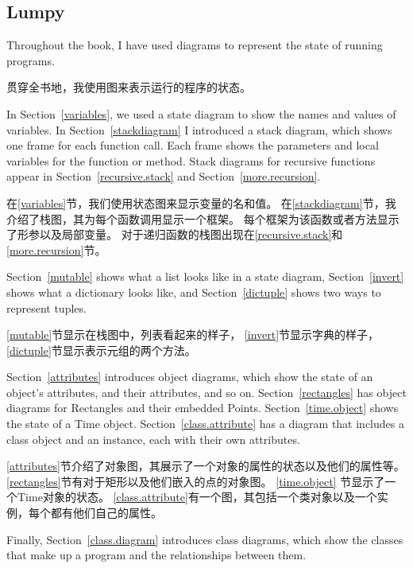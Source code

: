 \documentclass[10pt]{book}
\begin{document}
\begin{CJK}{UTF8}{gbsn}
\chapter{Lumpy}
\label{lumpy}

Throughout the book, I have used diagrams to represent the state of
running programs.

贯穿全书地，我使用图来表示运行的程序的状态。

In Section~\ref{variables}, we used a state diagram to show the names
and values of variables.  In Section~\ref{stackdiagram} I introduced a
stack diagram, which shows one frame for each function call.  Each
frame shows the parameters and local variables for the function or
method.  Stack diagrams for recursive functions appear in
Section~\ref{recursive.stack} and Section~\ref{more.recursion}.
 
 

在\ref{variables}节，我们使用状态图来显示变量的名和值。
在\ref{stackdiagram}节，我介绍了栈图，其为每个函数调用显示一个框架。
每个框架为该函数或者方法显示了形参以及局部变量。
对于递归函数的栈图出现在\ref{recursive.stack}和\ref{more.recursion}节。

Section~\ref{mutable} shows what a list looks like in a state diagram,
Section~\ref{invert} shows what a dictionary looks like, and
Section~\ref{dictuple} shows two ways to represent tuples.

\ref{mutable}节显示在栈图中，列表看起来的样子，
\ref{invert}节显示字典的样子，\ref{dictuple}节显示表示元组的两个方法。

Section~\ref{attributes} introduces object diagrams, which show the
state of an object's attributes, and their attributes, and so on.
Section~\ref{rectangles} has object diagrams for Rectangles and
their embedded Points.  Section~\ref{time.object} shows the state
of a Time object.
Section~\ref{class.attribute} has a diagram that includes a class
object and an instance, each with their own attributes.

\ref{attributes}节介绍了对象图，其展示了一个对象的属性的状态以及他们的属性等。
\ref{rectangles}节有对于矩形以及他们嵌入的点的对象图。
\ref{time.object} 节显示了一个Time对象的状态。
\ref{class.attribute}有一个图，其包括一个类对象以及一个实例，每个都有他们自己的属性。

Finally, Section~\ref{class.diagram} introduces class diagrams,
which show the classes that make up a program and the relationships
between them.


\end{CJK}
\end{document}
